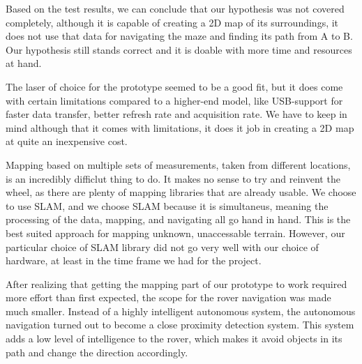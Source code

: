 Based on the test results, we can conclude that our hypothesis was not covered completely, although it is capable of creating a 2D map of its surroundings, it does not use that data for navigating the maze and finding its path from A to B. Our hypothesis still stands correct and it is doable with more time and resources at hand.

The laser of choice for the prototype seemed to be a good fit, but it does come with certain limitations compared to a higher-end model, like USB-support for faster data transfer, better refresh rate and acquisition rate. We have to keep in mind although that it comes with limitations, it does it job in creating a 2D map at quite an inexpensive cost.

Mapping based on multiple sets of measurements, taken from different locations, is an incredibly difficlut thing to do. It makes no sense to try and reinvent the wheel, as there are plenty of mapping libraries that are already usable. We choose to use SLAM, and we choose SLAM because it is simultaneus, meaning the processing of the data, mapping, and navigating all go hand in hand. This is the best suited approach for mapping unknown, unaccessable terrain. However, our particular choice of SLAM library did not go very well with our choice of hardware, at least in the time frame we had for the project.

After realizing that getting the mapping part of our prototype to work required more effort than first expected, the scope for the rover navigation was made much smaller. Instead of a highly intelligent autonomous system, the autonomous navigation turned out to become a close proximity detection system. This system adds a low level of intelligence to the rover, which makes it avoid objects in its path and change the direction accordingly. 
